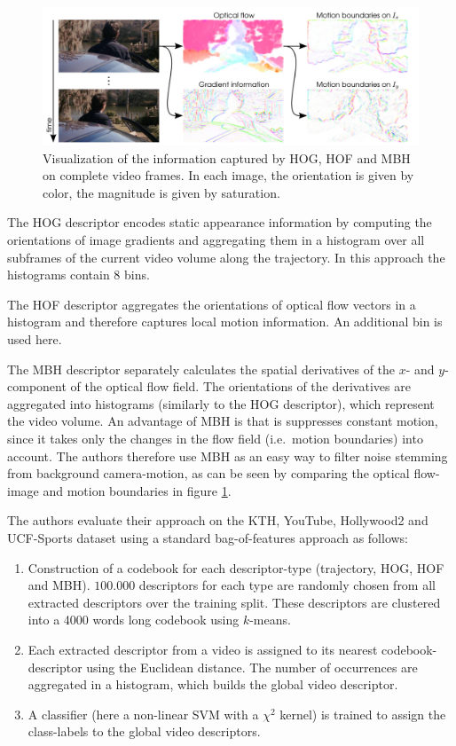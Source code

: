 \begin{figure}[H]
    \centering
    \includegraphics[width=\textwidth]{img_conventional/densetrajectories_featurevisualization}
    \caption{Visualization of the information captured by HOG, HOF and MBH on complete video frames. In each image, the orientation is given by color, the magnitude is given by saturation. \cite{wang_action_2011}}
    \label{fig:densetrajectories_featurevisualization}
\end{figure}

The HOG descriptor encodes static appearance information by computing the orientations of image gradients and aggregating them in a histogram over all subframes of the current video volume along the trajectory. In this approach the histograms contain 8 bins.

The HOF descriptor aggregates the orientations of optical flow vectors in a histogram and therefore captures local motion information. An additional bin is used here.

The MBH descriptor separately calculates the spatial derivatives of the $x$- and $y$-component of the optical flow field.
The orientations of the derivatives are aggregated into histograms (similarly to the HOG descriptor), which represent the video volume.
An advantage of MBH is that is suppresses constant motion, since it takes only the changes in the flow field (i.e.\ motion boundaries) into account.
The authors therefore use MBH as an easy way to filter noise stemming from background camera-motion, as can be seen by comparing the optical flow-image and motion boundaries in figure \ref{fig:densetrajectories_featurevisualization}.

The authors evaluate their approach on the KTH, YouTube, Hollywood2 and UCF-Sports dataset using a standard bag-of-features approach as follows:

\begin{enumerate}
    \item Construction of a codebook for each descriptor-type (trajectory, HOG, HOF and MBH).
        $100.000$ descriptors for each type are randomly chosen from all extracted descriptors over the training split.
        These descriptors are clustered into a 4000 words long codebook using $k$-means.
    \item Each extracted descriptor from a video is assigned to its nearest codebook-descriptor using the Euclidean distance.
        The number of occurrences are aggregated in a histogram, which builds the global video descriptor.
    \item A classifier (here a non-linear SVM with a $\chi^2$ kernel) is trained to assign the class-labels to the global video descriptors.
\end{enumerate}

